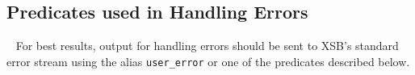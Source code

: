 %
%
%
%

\subsection{Predicates used in Handling Errors}~\label{sec:catch}
%
For best results, output for handling errors should be sent to XSB's
standard error stream using the alias {\tt user\_error} or one of the
predicates described below.

